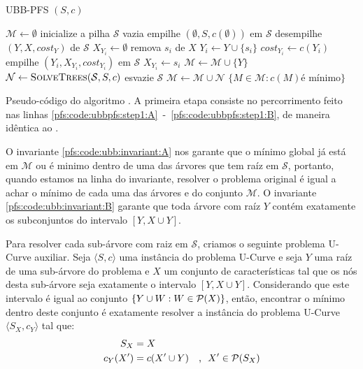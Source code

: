 \begin{algorithm}[!ht]
\textsc{UBB-PFS} $(S, c)$
\begin{algorithmic}[1]
    \State $\mathcal{M} \gets \emptyset$
    \State inicialize a pilha $\mathcal{S}$ vazia
    \State empilhe $(\emptyset, S, c(\emptyset))$ em $\mathcal{S}$
     \label{pfs:code:ubbpfs:step1:A}
        \State desempilhe $(Y, X, cost_Y)$ de $\mathcal{S}$
        \State $X_{Y_i} \gets \emptyset$
            \State remova $s_i$ de $X$
            \State $Y_i \gets Y \cup \{s_i\}$
            \State $cost_{Y_i} \gets c (Y_i)$
                \State empilhe $(Y_i, X_{Y_i}, cost_{Y_i})$ em $\mathcal{S}$
            \EndIf
            \State $X_{Y_i} \gets {s_i}$
        \EndWhile
        \State $\mathcal{M} \gets \mathcal{M} \cup \{Y\}$ \label{pfs:code:ubbpfs:invariant}
            \State $\mathcal{N} \gets {\normalfont\textsc{SolveTrees}} (\mathcal{S}, S, c)$
            \State esvazie $\mathcal{S}$
        \EndIf
    \EndWhile \label{pfs:code:ubbpfs:step1:B}
    \State $\mathcal{M} \gets \mathcal{M} \cup \mathcal{N}$
    \Return $\{M \in \mathcal{M} : c(M) \text{é mínimo}\}$
\end{algorithmic}
\caption{Pseudo-código do algoritmo . A primeira etapa 
consiste no percorrimento feito nas linhas 
\ref{pfs:code:ubbpfs:step1:A}~-~\ref{pfs:code:ubbpfs:step1:B}, de 
maneira idêntica ao .}
\label{pfs:code:ubbpfs:step1}
\end{algorithm}


O invariante \ref{pfs:code:ubb:invariant:A} nos garante que o mínimo
global já está em $\mathcal{M}$ ou é minimo dentro de uma das árvores
que tem raíz em $\mathcal{S}$, portanto, quando estamos na linha do 
invariante, resolver o problema original é igual a achar o mínimo
de cada uma das árvores e do conjunto $\mathcal{M}$. O invariante
\ref{pfs:code:ubb:invariant:B} garante que toda árvore com raíz $Y$ 
contém exatamente os subconjuntos do intervalo $[Y, X \cup Y]$. 

Para resolver cada sub-árvore com raiz em $\mathcal{S}$, criamos o 
seguinte problema U-Curve auxiliar. Seja $\langle S, c \rangle$ uma 
instância do problema U-Curve e seja $Y$ uma raíz de uma sub-árvore do 
problema e $X$ um conjunto de características tal que os nós desta 
sub-árvore seja exatamente o intervalo $[Y, X \cup Y]$. Considerando que
este intervalo é igual ao conjunto $\{Y \cup W : W \in \mathcal{P}(X)\}$,
então, encontrar o mínimo dentro deste conjunto é exatamente resolver a 
instância do problema U-Curve $\langle S_X, c_Y\rangle$ tal que:
\begin{alignat*}{2}
    S_X      & = X & \\
    c_Y (X') & = c (X' \cup Y) & \text{, } ~X' \in \mathcal{P}(S_X) \\
\end{alignat*}

